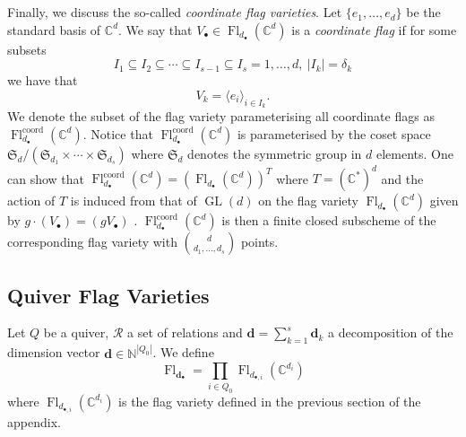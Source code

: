 \documentclass{amsart}
\theoremstyle{plain}
\numberwithin{equation}{section}
\theoremstyle{definition}
\theoremstyle{remark}
\begin{document}
	\\
	\\
	Finally, we discuss the so-called \emph{coordinate flag varieties}. Let $\{e_1,\ldots,e_d\}$ be the standard basis of $\mathbb{C}^d$. We say that $V_{\bullet}\in \operatorname{Fl}_{d_\bullet}(\mathbb{C}^d)$ is a \emph{coordinate flag} if for some subsets
	$$
	I_1\subseteq I_2\subseteq \cdots \subseteq I_{s-1}\subseteq I_s={1,\ldots,d}, \ |I_k|=\delta_{k}
	$$ 
	we have that 
	$$V_{k}=\langle e_i\rangle_{i\in I_k}.$$
	We denote  the subset of the flag variety parameterising all coordinate flags as $\operatorname{Fl}^{\text{coord}}_{d_\bullet}(\mathbb{C}^d)$. Notice that $\operatorname{Fl}^{\text{coord}}_{d_\bullet}(\mathbb{C}^d)$ is parameterised by the coset space $\mathfrak{S}_d/(\mathfrak{S}_{d_1}\times \cdots \times\mathfrak{S}_{d_s})$ where $\mathfrak{S}_d$ denotes the symmetric group in $d$ elements. One can show that $\operatorname{Fl}^{\text{coord}}_{d_\bullet}(\mathbb{C}^d)=(\operatorname{Fl}_{d_\bullet}(\mathbb{C}^d))^T$ where $T=(\mathbb{C}^*)^d$ and the action of $T$ is induced from that of $\operatorname{GL}(d)$ on the flag variety $\operatorname{Fl}_{d_\bullet}(\mathbb{C}^d)$ given by $g\cdot(V_\bullet)=(gV_\bullet)$ \cite[Section 15.3]{AndersonFultonEquivariantCohomology}. $\operatorname{Fl}^{\text{coord}}_{d_\bullet}(\mathbb{C}^d)$ is then a finite closed subscheme \cite[Theorem 7.1]{MilneAlgebraicGroups} of the corresponding flag variety with $\binom{d}{d_{1},\ldots,d_{s}}$ points.
	
	\subsection{Quiver Flag Varieties}\label{quiverFlagVarieties}
	Let $Q$ be a quiver, $\mathcal{R}$ a set of relations and $\mathbf{d}=\sum_{k=1}^s\mathbf{d}_k$ a decomposition of the dimension vector $\mathbf{d}\in \mathbb{N}^{|Q_0|}$. We define $$\operatorname{Fl}_{\mathbf{d}_\bullet}=\prod_{i\in Q_0}\operatorname{Fl}_{d_{\bullet,i}}(\mathbb{C}^{d_i})$$
	where $\operatorname{Fl}_{d_{\bullet,i}}(\mathbb{C}^{d_i})$ is the flag variety defined in the previous section of the appendix.
	
\end{document}
